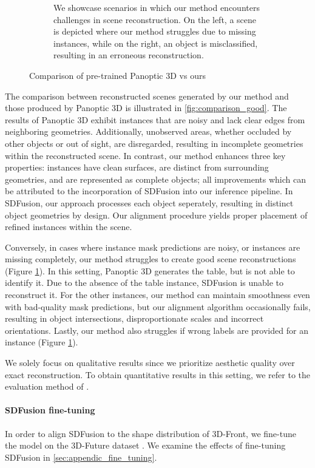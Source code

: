\begin{figure}
\begin{subfigure}[t]{56mm}
    \caption{We showcase scenarios in which our method encounters challenges in scene reconstruction. On the left, a scene is depicted where our method struggles due to missing instances, while on the right, an object is misclassified, resulting in an erroneous reconstruction.}\label{fig:comparison_bad}
  \end{subfigure}
  \caption{Comparison of pre-trained Panoptic 3D \citep{dahnert2021panoptic} vs ours}
  \label{fig:comparison_all}
\end{figure}

The comparison between reconstructed scenes generated by our method and those produced by Panoptic 3D is illustrated in \ref{fig:comparison_good}.
The results of Panoptic 3D exhibit instances that are noisy and lack clear edges from neighboring geometries.
Additionally, unobserved areas, whether occluded by other objects or out of sight, are disregarded, resulting in incomplete geometries within the reconstructed scene.
In contrast, our method enhances three key properties: instances have clean surfaces, are distinct from surrounding geometries, and are represented as complete objects;
all improvements which can be attributed to the incorporation of SDFusion into our inference pipeline.
In SDFusion, our approach processes each object seperately, resulting in distinct object geometries by design. Our alignment procedure yields proper placement of refined instances within the scene.

Conversely, in cases where instance mask predictions are noisy, or instances are missing completely, our method struggles to create good scene reconstructions (Figure \ref{fig:comparison_bad}). In this setting, Panoptic 3D generates the table, but is not able to identify it. Due to the absence of the table instance, SDFusion is unable to reconstruct it. For the other instances, our method can maintain smoothness even with bad-quality mask predictions, but our alignment algorithm occasionally fails, resulting in object intersections, disproportionate scales and incorrect orientations. Lastly, our method also struggles if wrong labels are provided for an instance (Figure \ref{fig:comparison_bad}).

We solely focus on qualitative results since we prioritize aesthetic quality over exact reconstruction. To obtain quantitative results in this setting, we refer to the evaluation method of \citet{wu2018learning}.
\paragraph{SDFusion fine-tuning}

In order to align SDFusion to the shape distribution of 3D-Front, we fine-tune the model on the 3D-Future dataset \citep{fu20213e}.
We examine the effects of fine-tuning SDFusion in \ref{sec:appendic_fine_tuning}.
